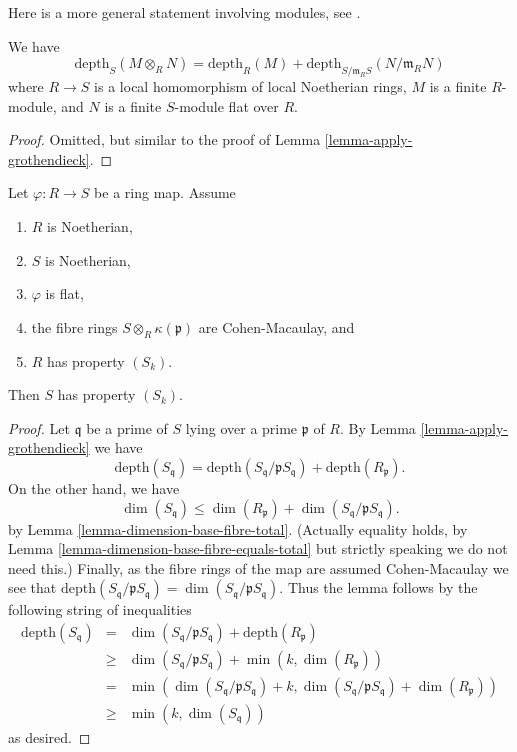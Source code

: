 \noindent
Here is a more general statement involving modules, see
\cite[IV, Proposition 6.3.1]{EGA}.

\begin{lemma}
\label{lemma-apply-grothendieck-module}
We have
$$
\text{depth}_S(M \otimes_R N)
=
\text{depth}_R(M) + \text{depth}_{S/\mathfrak m_RS}(N/\mathfrak m_RN)
$$
where $R \to S$ is a local homomorphism of local Noetherian rings,
$M$ is a finite $R$-module, and $N$ is a finite $S$-module flat over $R$.
\end{lemma}

\begin{proof}
Omitted, but similar to the proof of Lemma \ref{lemma-apply-grothendieck}.
\end{proof}

\begin{lemma}
\label{lemma-Sk-goes-up}
Let $\varphi : R \to S$ be a ring map. Assume
\begin{enumerate}
\item $R$ is Noetherian,
\item $S$ is Noetherian,
\item $\varphi$ is flat,
\item the fibre rings $S \otimes_R \kappa(\mathfrak p)$ are Cohen-Macaulay, and
\item $R$ has property $(S_k)$.
\end{enumerate}
Then $S$ has property $(S_k)$.
\end{lemma}

\begin{proof}
Let $\mathfrak q$ be a prime of $S$
lying over a prime $\mathfrak p$ of $R$. By
Lemma \ref{lemma-apply-grothendieck} we have
$$
\text{depth}(S_{\mathfrak q}) =
\text{depth}(S_{\mathfrak q}/\mathfrak pS_{\mathfrak q}) +
\text{depth}(R_{\mathfrak p}).
$$
On the other hand, we have
$$
\dim(S_{\mathfrak q})
\leq
\dim(R_{\mathfrak p})
+
\dim(S_{\mathfrak q}/\mathfrak pS_{\mathfrak q}).
$$
by Lemma \ref{lemma-dimension-base-fibre-total}.
(Actually equality holds, by
Lemma \ref{lemma-dimension-base-fibre-equals-total}
but strictly speaking we do not need this.)
Finally, as the fibre rings of the map
are assumed Cohen-Macaulay we see that
$\text{depth}(S_{\mathfrak q}/\mathfrak pS_{\mathfrak q}) =
\dim(S_{\mathfrak q}/\mathfrak pS_{\mathfrak q})$.
Thus the lemma follows by the following string of inequalities
\begin{eqnarray*}
\text{depth}(S_{\mathfrak q}) & = &
\dim(S_{\mathfrak q}/\mathfrak pS_{\mathfrak q}) +
\text{depth}(R_{\mathfrak p}) \\
& \geq &
\dim(S_{\mathfrak q}/\mathfrak pS_{\mathfrak q}) +
\min(k, \dim(R_{\mathfrak p})) \\
& = &
\min(\dim(S_{\mathfrak q}/\mathfrak pS_{\mathfrak q}) + k,
\dim(S_{\mathfrak q}/\mathfrak pS_{\mathfrak q}) +
\dim(R_{\mathfrak p})) \\
& \geq &
\min(k, \dim(S_{\mathfrak q}))
\end{eqnarray*}
as desired.
\end{proof}

